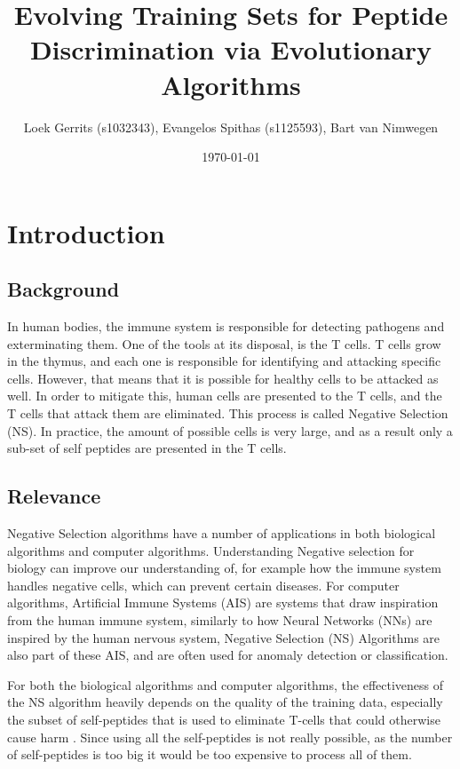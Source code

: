 \documentclass{article}
\title{Evolving Training Sets for Peptide Discrimination via Evolutionary Algorithms}
\author{Loek Gerrits (s1032343), Evangelos Spithas (s1125593), Bart van Nimwegen}
\date{\today}
\begin{document}
 

\maketitle

\section{Introduction}

\subsection{Background}

In human bodies, the immune system is responsible for detecting pathogens and exterminating them. 
One of the tools at its disposal, is the T cells. T cells grow in the thymus, and each one is responsible for
identifying and attacking specific cells. However, that means that it is possible for healthy cells to be
attacked as well. In order to mitigate this, human cells are presented to the T cells, and the T cells that attack them 
are eliminated. This process is called Negative Selection (NS). In practice, the amount of possible cells is very large, and as a result only a sub-set of self peptides are presented
in the T cells. 

\subsection{Relevance}
Negative Selection algorithms have a number of  applications in both biological algorithms and computer algorithms.
Understanding Negative selection for biology can improve our understanding of, for example how the immune system handles
negative cells, which can prevent certain diseases. For computer algorithms, Artificial Immune Systems (AIS) are systems
that draw inspiration from the human immune system, similarly to how Neural Networks (NNs) are inspired by the human 
nervous system, Negative Selection (NS) Algorithms are also part of these AIS, and are often used for anomaly detection 
or classification.

For both the biological algorithms and computer algorithms, the effectiveness of the NS algorithm heavily depends
on the quality of the training data, especially the subset of self-peptides that is used to eliminate T-cells that
could otherwise cause harm . Since using all the self-peptides is not really possible,
as the number of self-peptides is too big it would be too expensive to process all of them.
\end{document}
